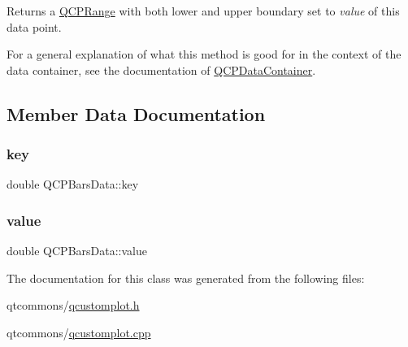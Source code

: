 Returns a \mbox{\hyperlink{class_q_c_p_range}{Q\+C\+P\+Range}} with both lower and upper boundary set to {\itshape value} of this data point.

For a general explanation of what this method is good for in the context of the data container, see the documentation of \mbox{\hyperlink{class_q_c_p_data_container}{Q\+C\+P\+Data\+Container}}. 

\subsection{Member Data Documentation}
\mbox{\label{class_q_c_p_bars_data_a09b492217dc03ee1c0348a2f2e6e0a04}} 
\subsubsection{\texorpdfstring{key}{key}}
{\footnotesize\ttfamily double Q\+C\+P\+Bars\+Data\+::key}

\mbox{\label{class_q_c_p_bars_data_ab636644fb40630f3b1b72f44d65ec072}} 
\subsubsection{\texorpdfstring{value}{value}}
{\footnotesize\ttfamily double Q\+C\+P\+Bars\+Data\+::value}



The documentation for this class was generated from the following files\+:\begin{DoxyCompactItemize}
\item 
qtcommons/\mbox{\hyperlink{qcustomplot_8h}{qcustomplot.\+h}}\item 
qtcommons/\mbox{\hyperlink{qcustomplot_8cpp}{qcustomplot.\+cpp}}\end{DoxyCompactItemize}
